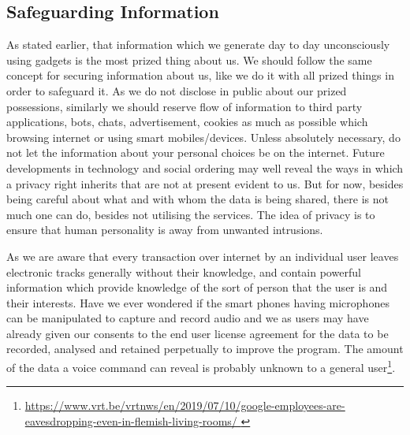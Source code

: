 \begin{multicols}{2}
\section{Safeguarding Information}

As stated earlier, that information which we generate day to day unconsciously using gadgets is the most prized thing about us. We should follow the same concept for securing information about us, like we do it with all prized things in order to safeguard it. As we do not disclose in public about our prized possessions, similarly we should reserve flow of information to third party applications, bots, chats, advertisement, cookies as much as possible which browsing internet or using smart mobiles/devices. Unless absolutely necessary, do not let the information about your personal choices be on the internet. Future developments in technology and social ordering may well reveal the ways in which a privacy right inherits that are not at present evident to us. But for now, besides being careful about what and with whom the data is being shared, there is not much one can do, besides not utilising the services. The idea of privacy is to ensure that human personality is away from unwanted intrusions.

As we are aware that every transaction over internet by an individual user leaves electronic tracks generally without their knowledge, and contain powerful information which provide knowledge of the sort of person that the user is and their interests. Have we ever wondered if the smart phones having microphones can be manipulated to capture and record audio and we as users may have already given our consents to the end user license agreement for the data to be recorded, analysed and retained perpetually to improve the program. The amount of the data a voice command can reveal is probably unknown to a general user\footnote{\url{https://www.vrt.be/vrtnws/en/2019/07/10/google-employees-are-eavesdropping-even-in-flemish-living-rooms/ }}.


\end{multicols}
